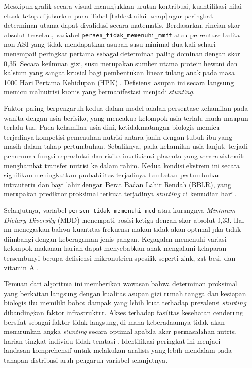 Meskipun grafik secara visual menunjukkan urutan kontribusi, kuantifikasi nilai eksak tetap dijabarkan pada Tabel \ref{table:4.nilai_shap} agar peringkat determinan utama dapat divalidasi secara matematis. Berdasarkan rincian skor absolut tersebut, variabel \texttt{persen\_tidak\_memenuhi\_mmff} atau persentase balita non-ASI yang tidak mendapatkan asupan susu minimal dua kali sehari menempati peringkat pertama sebagai determinan paling dominan dengan skor 0,35. Secara keilmuan gizi, susu merupakan sumber utama protein hewani dan kalsium yang sangat krusial bagi pembentukan linear tulang anak pada masa 1000 Hari Pertama Kehidupan (HPK) \cite{Headey2018}. Defisiensi asupan ini secara langsung memicu malnutrisi kronis yang bermanifestasi menjadi \textit{stunting}.

Faktor paling berpengaruh kedua dalam model adalah persentase kehamilan pada wanita dengan usia berisiko, yang mencakup kelompok usia terlalu muda maupun terlalu tua. Pada kehamilan usia dini, ketidakmatangan biologis memicu terjadinya kompetisi pemenuhan nutrisi antara janin dengan tubuh ibu yang masih dalam tahap pertumbuhan. Sebaliknya, pada kehamilan usia lanjut, terjadi penurunan fungsi reproduksi dan risiko insufisiensi plasenta yang secara sistemik menghambat transfer nutrisi ke dalam rahim. Kedua kondisi ekstrem ini secara signifikan meningkatkan probabilitas terjadinya hambatan pertumbuhan intrauterin dan bayi lahir dengan Berat Badan Lahir Rendah (BBLR), yang merupakan prediktor proksimal terkuat terjadinya \textit{stunting} di kemudian hari \cite{Rahman2025}.

Selanjutnya, variabel \texttt{persen\_tidak\_memenuhi\_mdd} atau kurangnya \textit{Minimum Dietary Diversity} (MDD) menempati posisi ketiga dengan skor absolut 0,33. Hal ini menegaskan bahwa kuantitas frekuensi makan tidak akan optimal jika tidak diimbangi dengan keberagaman jenis pangan. Kegagalan memenuhi variasi kelompok makanan harian dapat menyebabkan anak mengalami kelaparan tersembunyi berupa defisiensi mikronutrien spesifik seperti zink, zat besi, dan vitamin A \cite{UNICEF2024_ChildFoodPoverty}.

Temuan dari algoritma ini memberikan wawasan bahwa determinan proksimal yang berkaitan langsung dengan kualitas asupan gizi rumah tangga dan kesiapan biologis ibu memiliki bobot dampak yang lebih kuat terhadap prevalensi \textit{stunting} dibandingkan faktor infrastruktur. Akses terhadap fasilitas kesehatan cenderung bersifat sebagai faktor tidak langsung, di mana keberadaannya tidak akan menurunkan angka \textit{stunting} secara optimal apabila akar permasalahan nutrisi harian tingkat individu tidak teratasi \cite{UNICEF2021_ConceptualFramework}. Identifikasi peringkat ini menjadi landasan komprehensif untuk melakukan analisis yang lebih mendalam pada tahapan distribusi arah pengaruh variabel selanjutnya.

